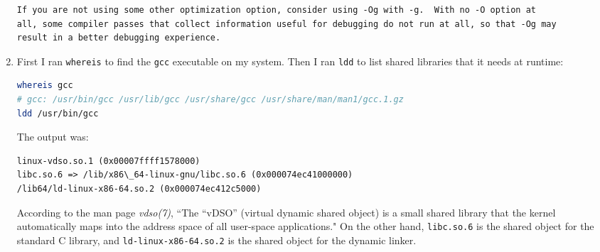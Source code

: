\documentclass[12pt]{article}
\newenvironment{sol}[1][Solution]{\begin{trivlist}
		\item[\hskip \labelsep {\bfseries #1:}]}{\end{trivlist}}
\begin{document}
\begin{sol}
\begin{enumerate}[label=(\alph*)]
\begin{lstlisting}[language={}]
If you are not using some other optimization option, consider using -Og with -g.  With no -O option at
all, some compiler passes that collect information useful for debugging do not run at all, so that -Og may
result in a better debugging experience.
		\end{lstlisting}
		\item First I ran \texttt{whereis} to find the \texttt{gcc} executable on my system. Then I ran
		\texttt{ldd} to list shared libraries that it needs at runtime:
		\begin{lstlisting}[language=bash]
whereis gcc
# gcc: /usr/bin/gcc /usr/lib/gcc /usr/share/gcc /usr/share/man/man1/gcc.1.gz
ldd /usr/bin/gcc
		\end{lstlisting}
		The output was:
		\begin{lstlisting}[language={}]
	linux-vdso.so.1 (0x00007ffff1578000)
libc.so.6 => /lib/x86\_64-linux-gnu/libc.so.6 (0x000074ec41000000)
/lib64/ld-linux-x86-64.so.2 (0x000074ec412c5000)
		\end{lstlisting}
		According to the man page \emph{vdso(7)}, ``The ``vDSO'' (virtual dynamic shared object) is a small shared library that the kernel automatically maps into the address space
		of all user-space applications." On the other hand, \texttt{libc.so.6} is the shared object
		for the standard C library, and \texttt{ld-linux-x86-64.so.2} is the shared object
		for the dynamic linker.
	\end{enumerate}
\end{sol}
\end{document}
